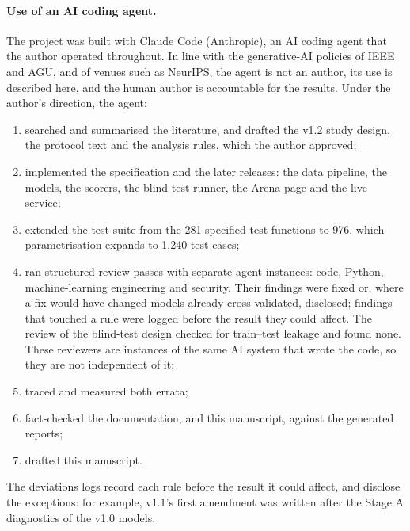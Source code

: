 \documentclass[10pt,twocolumn,a4paper]{article}
\begin{document}
\paragraph{Use of an AI coding agent.} The project was built with Claude Code (Anthropic), an AI coding agent that the
author operated throughout. In line with the generative-AI policies of IEEE and AGU, and of venues such as NeurIPS, the
agent is not an author, its use is described here, and the human author is accountable for the results. Under the
author's direction, the agent:
\begin{enumerate}[label=(\roman*)]
  \item searched and summarised the literature, and drafted the v1.2 study design, the protocol text and the analysis
    rules, which the author approved;
  \item implemented the specification and the later releases: the data pipeline, the models, the scorers, the
    blind-test runner, the Arena page and the live service;
  \item extended the test suite from the 281 specified test functions to 976, which parametrisation expands to
    1,240 test cases;
  \item ran structured review passes with separate agent instances: code, Python, machine-learning engineering and
    security. Their findings were fixed or, where a fix would have changed models already cross-validated,
    disclosed; findings that touched a rule were logged before the result they could affect. The review of the
    blind-test design checked for train--test leakage and found none. These reviewers are instances of the same AI
    system that wrote the code, so they are not independent of it;
  \item traced and measured both errata;
  \item fact-checked the documentation, and this manuscript, against the generated reports;
  \item drafted this manuscript.
\end{enumerate}
The deviations logs record each rule before the result it could affect, and disclose the exceptions: for example,
v1.1's first amendment was written after the Stage A diagnostics of the v1.0 models.
\end{document}
